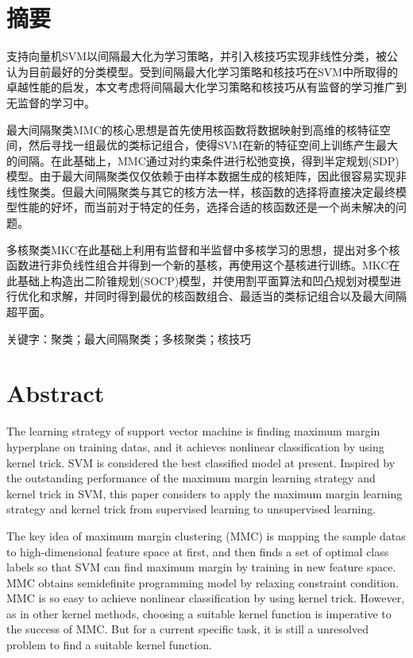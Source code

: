 \chapter*{摘\hspace{1em}要}
支持向量机SVM以间隔最大化为学习策略，并引入核技巧实现非线性分类，被公认为目前最好的分类模型。受到间隔最大化学习策略和核技巧在SVM中所取得的卓越性能的启发，本文考虑将间隔最大化学习策略和核技巧从有监督的学习推广到无监督的学习中。

最大间隔聚类MMC的核心思想是首先使用核函数将数据映射到高维的核特征空间，然后寻找一组最优的类标记组合，使得SVM在新的特征空间上训练产生最大的间隔。在此基础上，MMC通过对约束条件进行松弛变换，得到半定规划(SDP)模型。由于最大间隔聚类仅仅依赖于由样本数据生成的核矩阵，因此很容易实现非线性聚类。但最大间隔聚类与其它的核方法一样，核函数的选择将直接决定最终模型性能的好坏，而当前对于特定的任务，选择合适的核函数还是一个尚未解决的问题。

多核聚类MKC在此基础上利用有监督和半监督中多核学习的思想，提出对多个核函数进行非负线性组合并得到一个新的基核，再使用这个基核进行训练。MKC在此基础上构造出二阶锥规划(SOCP)模型，并使用割平面算法和凹凸规划对模型进行优化和求解，并同时得到最优的核函数组合、最适当的类标记组合以及最大间隔超平面。

{\heiti 关键字：}聚类；最大间隔聚类；多核聚类；核技巧


\chapter*{\textbf{Abstract}}
The learning strategy of support vector machine is finding maximum margin hyperplane on training datas, and it achieves nonlinear classification by using kernel trick. SVM is considered the best classified model at present. Inspired by the outstanding performance of the maximum margin learning strategy and kernel trick in SVM, this paper considers to apply the maximum margin learning strategy and kernel trick from supervised learning to unsupervised  learning. 

The key idea of maximum margin clustering (MMC) is mapping the sample datas to high-dimensional feature space at first, and then finds a set of optimal class labels so that SVM can find maximum margin by training in new feature space. MMC obtains semidefinite programming model by relaxing constraint condition. MMC is so easy to achieve nonlinear classification by using kernel trick. However, as in other kernel methods, choosing a suitable kernel function is imperative to the success of MMC. But for a current specific task, it is still a unresolved problem to find a suitable kernel function.

